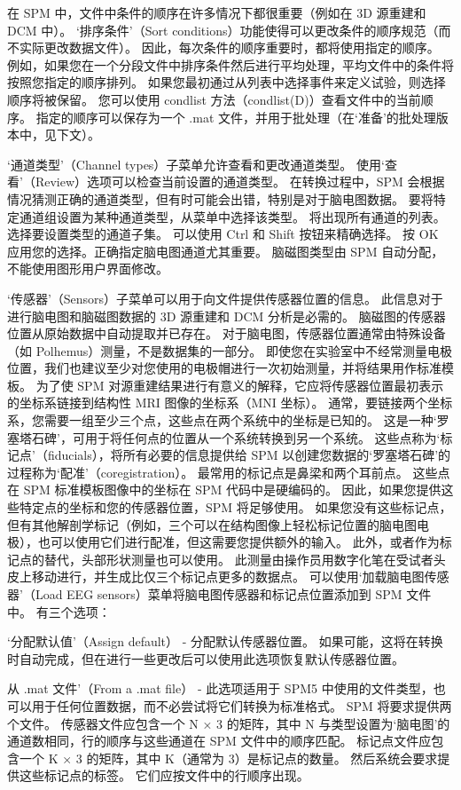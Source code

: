 在 SPM 中，文件中条件的顺序在许多情况下都很重要（例如在 3D 源重建和 DCM 中）。
‘排序条件’（Sort conditions）功能使得可以更改条件的顺序规范（而不实际更改数据文件）。
因此，每次条件的顺序重要时，都将使用指定的顺序。
例如，如果您在一个分段文件中排序条件然后进行平均处理，平均文件中的条件将按照您指定的顺序排列。
如果您最初通过从列表中选择事件来定义试验，则选择顺序将被保留。
您可以使用 condlist 方法（condlist(D)）查看文件中的当前顺序。
指定的顺序可以保存为一个 .mat 文件，并用于批处理（在‘准备’的批处理版本中，见下文）。


‘通道类型’（Channel types）子菜单允许查看和更改通道类型。
使用‘查看’（Review）选项可以检查当前设置的通道类型。
在转换过程中，SPM 会根据情况猜测正确的通道类型，但有时可能会出错，特别是对于脑电图数据。
要将特定通道组设置为某种通道类型，从菜单中选择该类型。
将出现所有通道的列表。选择要设置类型的通道子集。
可以使用 Ctrl 和 Shift 按钮来精确选择。
按 OK 应用您的选择。正确指定脑电图通道尤其重要。
脑磁图类型由 SPM 自动分配，不能使用图形用户界面修改。


‘传感器’（Sensors）子菜单可以用于向文件提供传感器位置的信息。
此信息对于进行脑电图和脑磁图数据的 3D 源重建和 DCM 分析是必需的。
脑磁图的传感器位置从原始数据中自动提取并已存在。
对于脑电图，传感器位置通常由特殊设备（如 Polhemus）测量，不是数据集的一部分。
即使您在实验室中不经常测量电极位置，我们也建议至少对您使用的电极帽进行一次初始测量，并将结果用作标准模板。
为了使 SPM 对源重建结果进行有意义的解释，它应将传感器位置最初表示的坐标系链接到结构性 MRI 图像的坐标系（MNI 坐标）。
通常，要链接两个坐标系，您需要一组至少三个点，这些点在两个系统中的坐标是已知的。
这是一种‘罗塞塔石碑’，可用于将任何点的位置从一个系统转换到另一个系统。
这些点称为‘标记点’（fiducials），将所有必要的信息提供给 SPM 以创建您数据的‘罗塞塔石碑’的过程称为‘配准’（coregistration）。
最常用的标记点是鼻梁和两个耳前点。
这些点在 SPM 标准模板图像中的坐标在 SPM 代码中是硬编码的。
因此，如果您提供这些特定点的坐标和您的传感器位置，SPM 将足够使用。
如果您没有这些标记点，但有其他解剖学标记（例如，三个可以在结构图像上轻松标记位置的脑电图电极），也可以使用它们进行配准，但这需要您提供额外的输入。
此外，或者作为标记点的替代，头部形状测量也可以使用。
此测量由操作员用数字化笔在受试者头皮上移动进行，并生成比仅三个标记点更多的数据点。
可以使用‘加载脑电图传感器’（Load EEG sensors）菜单将脑电图传感器和标记点位置添加到 SPM 文件中。
有三个选项：

‘分配默认值’（Assign default） - 分配默认传感器位置。
如果可能，这将在转换时自动完成，但在进行一些更改后可以使用此选项恢复默认传感器位置。

从 .mat 文件’（From a .mat file） - 此选项适用于 SPM5 中使用的文件类型，也可以用于任何位置数据，而不必尝试将它们转换为标准格式。
SPM 将要求提供两个文件。
传感器文件应包含一个 N × 3 的矩阵，其中 N 与类型设置为‘脑电图’的通道数相同，行的顺序与这些通道在 SPM 文件中的顺序匹配。
标记点文件应包含一个 K × 3 的矩阵，其中 K（通常为 3）是标记点的数量。
然后系统会要求提供这些标记点的标签。
它们应按文件中的行顺序出现。

